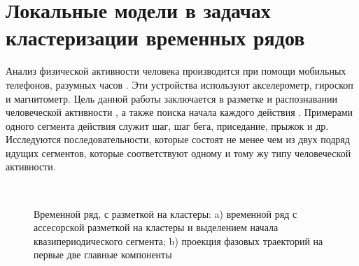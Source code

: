 \newpage


\section{Локальные модели в задачах кластеризации временных рядов}
Анализ физической активности человека производится при помощи мобильных телефонов, разумных часов \cite{kwapisz2010, wang2014}. 
Эти устройства используют акселерометр, гироскоп и магнитометр. 
Цель данной работы заключается в  разметке и распознавании человеческой активности \cite{Ignatov2015, Olivares2012, cinar2018}, а также поиска начала каждого действия \cite{motrenko2015}. 
Примерами одного сегмента действия служит шаг, шаг бега, приседание, прыжок и др. 
Исследуются последовательности, которые состоят не менее чем из двух подряд идущих сегментов, которые соответствуют одному и тому жу типу человеческой активности.

\begin{figure}[h!t]\center
{}
\\
\caption{Временной ряд, с разметкой на кластеры: a) временной ряд с ассесорской разметкой на кластеры и выделением начала квазипериодического сегмента; b) проекция фазовых траекторий на первые две главные компоненты }
\end{figure}

